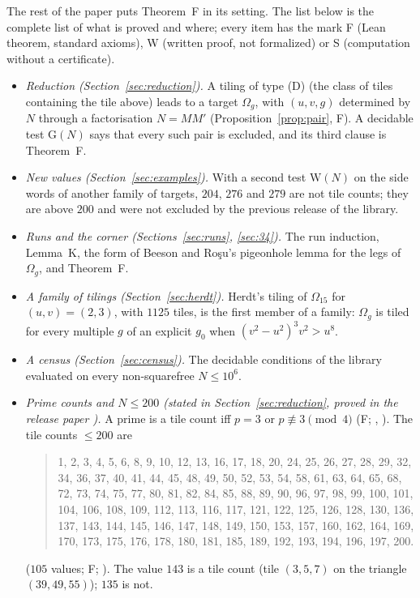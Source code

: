 \documentclass[11pt,reqno]{amsart}
\theoremstyle{plain}
\theoremstyle{definition}
\newcommand{\sF}{\textup{\textsf{F}}}
\newcommand{\sW}{\textup{\textsf{W}}}
\newcommand{\sS}{\textup{\textsf{S}}}
\begin{document}
The rest of the paper puts Theorem~F in its setting. The list below is the complete list of what is proved and where; every item has the mark \sF{} (Lean theorem, standard axioms), \sW{} (written proof, not formalized) or \sS{} (computation without a certificate).
\begin{itemize}
\item \emph{Reduction (Section~\ref{sec:reduction}).} A tiling of type (D) (the class of tiles containing the tile above) leads to a target $\Omega_{g}$, with $(u,v,g)$ determined by $N$ through a factorisation $N=MM'$ (Proposition~\ref{prop:pair}, \sF). A decidable test $\mathrm{G}(N)$ says that every such pair is excluded, and its third clause is Theorem~F.
\item \emph{New values (Section~\ref{sec:examples}).} With a second test $\mathrm{W}(N)$ on the side words of another family of targets, $204$, $276$ and $279$ are not tile counts; they are above $200$ and were not excluded by the previous release of the library.
\item \emph{Runs and the corner (Sections~\ref{sec:runs}, \ref{sec:34}).} The run induction, Lemma~K, the form of Beeson and Ro\c{s}u's pigeonhole lemma for the legs of $\Omega_{g}$, and Theorem~F.
\item \emph{A family of tilings (Section~\ref{sec:herdt}).} Herdt's tiling of $\Omega_{15}$ for $(u,v)=(2,3)$, with $1125$ tiles, is the first member of a family: $\Omega_{g}$ is tiled for every multiple $g$ of an explicit $g_0$ when $(v^2-u^2)^3v^2>u^8$.
\item \emph{A census (Section~\ref{sec:census}).} The decidable conditions of the library evaluated on every non-squarefree $N\le10^6$.
\item \emph{Prime counts and $N\le200$ (stated in Section~\ref{sec:reduction}, proved in the release paper \cite{ReleasePaper}).} A prime is a tile count iff $p=3$ or $p\not\equiv3\pmod4$ (\sF; , ). The tile counts $\le200$ are
\begin{quote}\small
1, 2, 3, 4, 5, 6, 8, 9, 10, 12, 13, 16, 17, 18, 20, 24, 25, 26, 27, 28, 29, 32, 34, 36, 37, 40, 41, 44, 45, 48, 49, 50, 52, 53, 54, 58, 61, 63, 64, 65, 68, 72, 73, 74, 75, 77, 80, 81, 82, 84, 85, 88, 89, 90, 96, 97, 98, 99, 100, 101, 104, 106, 108, 109, 112, 113, 116, 117, 121, 122, 125, 126, 128, 130, 136, 137, 143, 144, 145, 146, 147, 148, 149, 150, 153, 157, 160, 162, 164, 169, 170, 173, 175, 176, 178, 180, 181, 185, 189, 192, 193, 194, 196, 197, 200.
\end{quote}
($105$ values; \sF; ). The value $143$ is a tile count (tile $(3,5,7)$ on the triangle $(39,49,55)$); $135$ is not.
\end{itemize}
\end{document}
